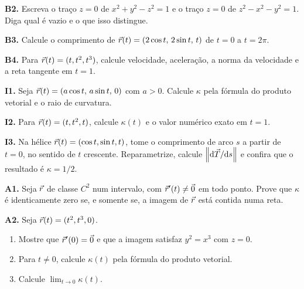 \documentclass[11pt,a4paper]{article}
\begin{document}
\begin{exercicio}
\textbf{B2.} Escreva o traço \(z=0\) de \(x^{2}+y^{2}-z^{2}=1\) e o traço \(z=0\) de \(z^{2}-x^{2}-y^{2}=1\). Diga qual é vazio e o que isso distingue.
\end{exercicio}

\begin{exercicio}
\textbf{B3.} Calcule o comprimento de \(\vec{r}(t)=(2\cos t,\,2\sin t,\,t)\) de \(t=0\) a \(t=2\pi\).
\end{exercicio}

\begin{exercicio}
\textbf{B4.} Para \(\vec{r}(t)=(t,t^{2},t^{3})\), calcule velocidade, aceleração, a norma da velocidade e a reta tangente em \(t=1\).
\end{exercicio}

\begin{exercicio}
\textbf{I1.} Seja \(\vec{r}(t)=(a\cos t,\,a\sin t,\,0)\) com \(a>0\). Calcule \(\kappa\) pela fórmula do produto vetorial e o raio de curvatura.
\end{exercicio}

\begin{exercicio}
\textbf{I2.} Para \(\vec{r}(t)=(t,t^{2},t)\), calcule \(\kappa(t)\) e o valor numérico exato em \(t=1\).
\end{exercicio}

\begin{exercicio}
\textbf{I3.} Na hélice \(\vec{r}(t)=(\cos t,\sin t,t)\), tome o comprimento de arco \(s\) a partir de \(t=0\), no sentido de \(t\) crescente. Reparametrize, calcule \(\left\lVert \mathrm{d}\vec{T}/\mathrm{d} s \right\rVert\) e confira que o resultado é \(\kappa=1/2\).
\end{exercicio}

\begin{exercicio}
\textbf{A1.} Seja \(\vec{r}\) de classe \(C^2\) num intervalo, com \(\vec{r}'(t)\neq\vec{0}\) em todo ponto. Prove que \(\kappa\) é identicamente zero se, e somente se, a imagem de \(\vec{r}\) está contida numa reta.
\end{exercicio}

\begin{exercicio}
\textbf{A2.} Seja \(\vec{r}(t)=(t^{2},t^{3},0)\).
\begin{enumerate}
\item Mostre que \(\vec{r}'(0)=\vec{0}\) e que a imagem satisfaz \(y^{2}=x^{3}\) com \(z=0\).
\item Para \(t\neq 0\), calcule \(\kappa(t)\) pela fórmula do produto vetorial.
\item Calcule \(\lim_{t\to 0}\kappa(t)\).
\end{enumerate}
\end{exercicio}
\end{document}
